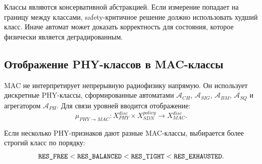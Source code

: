 \documentclass[10pt,a4paper]{article}
\newcommand{\code}[1]{\ifmmode\text{\ttfamily\detokenize{#1}}\else\texttt{\detokenize{#1}}\fi}
\newcommand{\A}[1]{\mathcal{A}_{#1}}
\begin{document}
Классы являются консервативной абстракцией. Если измерение попадает на границу между классами, safety-критичное решение должно использовать худший класс. Иначе автомат может доказать корректность для состояния, которое физически является деградированным.

\subsection{Отображение PHY-классов в MAC-классы}

MAC не интерпретирует непрерывную радиофизику напрямую. Он использует дискретные PHY-классы, сформированные автоматами \(\A{CH}\), \(\A{SIG}\), \(\A{BM}\), \(\A{SQ}\) и агрегатором \(\A{PH}\). Для связи уровней вводится отображение:
\[
\mu_{PHY\rightarrow MAC}:
X_{PHY}^{disc}\times X_{SDN}^{policy}\rightarrow X_{MAC}^{disc}.
\]

Если несколько PHY-признаков дают разные MAC-классы, выбирается более строгий класс по порядку:
\[
\code{RES_FREE}<\code{RES_BALANCED}<\code{RES_TIGHT}<\code{RES_EXHAUSTED}.
\]
\end{document}
